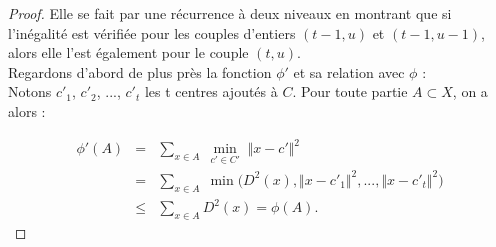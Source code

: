 \documentclass[12pt,a4paper]{book}
\newcommand{\1}{\mathds{1}}
\begin{document}
	\begin{proof}
		Elle se fait par une récurrence à deux niveaux en montrant que si l'inégalité est vérifiée pour les couples d'entiers $(t-1,u)$ et $(t-1,u-1)$, alors elle l'est également pour le couple $(t,u)$.\\
		
		Regardons d'abord de plus près la fonction $\phi'$ et sa relation avec $\phi$ :\\ 
		Notons $c'_1$, $c'_2$, ..., $c'_t$ les t centres ajoutés à $C$. Pour toute partie $A \subset X$, on a alors :
		
		\begin{eqnarray*}
			\phi' \left( A \right) &=& \sum_{x \in A} \; \min_{c' \in C'} \; \Vert x-c' \Vert^2 \\
			&=& \sum_{x \in A} \; \min	\bigg( D^2 \left(x \right),\Vert x-c'_1 \Vert^2 , ... ,\Vert x-c'_t \Vert^2 \bigg) \\
			& \leq & \sum_{x \in A}	D^2 \left(x \right)	= \phi \left( A \right).	
		\end{eqnarray*}
		

\end{proof}
\end{document}
